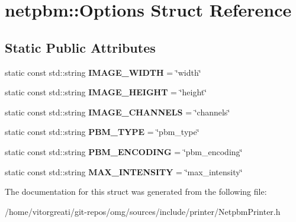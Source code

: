 \hypertarget{structnetpbm_1_1_options}{}\section{netpbm\+::Options Struct Reference}
\label{structnetpbm_1_1_options}
\subsection*{Static Public Attributes}
\begin{DoxyCompactItemize}
\item 
\mbox{\label{structnetpbm_1_1_options_a0ae064c4984a1de083057756681c9371}} 
static const std\+::string {\bfseries I\+M\+A\+G\+E\+\_\+\+W\+I\+D\+TH} = \char`\"{}width\char`\"{}
\item 
\mbox{\label{structnetpbm_1_1_options_a054980a1778121da004853af42407fc3}} 
static const std\+::string {\bfseries I\+M\+A\+G\+E\+\_\+\+H\+E\+I\+G\+HT} = \char`\"{}height\char`\"{}
\item 
\mbox{\label{structnetpbm_1_1_options_add3fdf62942740ad19bafb3443dfe1ab}} 
static const std\+::string {\bfseries I\+M\+A\+G\+E\+\_\+\+C\+H\+A\+N\+N\+E\+LS} = \char`\"{}channels\char`\"{}
\item 
\mbox{\label{structnetpbm_1_1_options_a04cd03b56607c11adef82eab62f99c04}} 
static const std\+::string {\bfseries P\+B\+M\+\_\+\+T\+Y\+PE} = \char`\"{}pbm\+\_\+type\char`\"{}
\item 
\mbox{\label{structnetpbm_1_1_options_a1ad6483eb76f8a23a98a288b22b2a993}} 
static const std\+::string {\bfseries P\+B\+M\+\_\+\+E\+N\+C\+O\+D\+I\+NG} = \char`\"{}pbm\+\_\+encoding\char`\"{}
\item 
\mbox{\label{structnetpbm_1_1_options_a83336d6b8540821700ed1a489c89130b}} 
static const std\+::string {\bfseries M\+A\+X\+\_\+\+I\+N\+T\+E\+N\+S\+I\+TY} = \char`\"{}max\+\_\+intensity\char`\"{}
\end{DoxyCompactItemize}


The documentation for this struct was generated from the following file\+:\begin{DoxyCompactItemize}
\item 
/home/vitorgreati/git-\/repos/omg/sources/include/printer/Netpbm\+Printer.\+h\end{DoxyCompactItemize}
